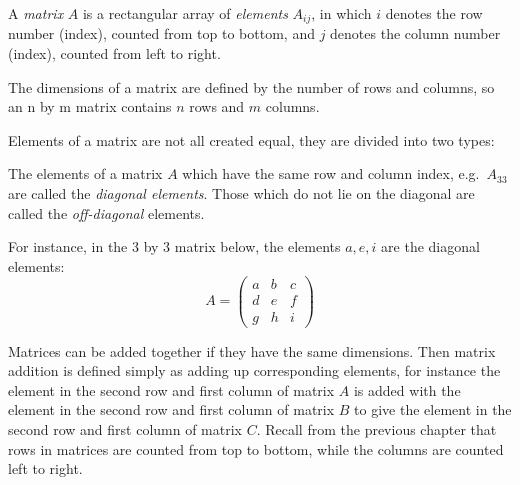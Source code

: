 \documentclass[
  letterpaper,
  DIV=11,
  numbers=noendperiod]{scrreprt}
\begin{document}
\begin{tcolorbox}[enhanced jigsaw, arc=.35mm, colframe=quarto-callout-note-color-frame, left=2mm, opacitybacktitle=0.6, breakable, title=\textcolor{quarto-callout-note-color}{\faInfo}\hspace{0.5em}{Definition}, toprule=.15mm, coltitle=black, bottomtitle=1mm, toptitle=1mm, colback=white, leftrule=.75mm, colbacktitle=quarto-callout-note-color!10!white, titlerule=0mm, opacityback=0, rightrule=.15mm, bottomrule=.15mm]

A \emph{matrix} \(A\) is a rectangular array of \emph{elements}
\(A_{ij}\), in which \(i\) denotes the row number (index), counted from
top to bottom, and \(j\) denotes the column number (index), counted from
left to right.

The dimensions of a matrix are defined by the number of rows and
columns, so an n by m matrix contains \(n\) rows and \(m\) columns.

\end{tcolorbox}

Elements of a matrix are not all created equal, they are divided into
two types:

\begin{tcolorbox}[enhanced jigsaw, arc=.35mm, colframe=quarto-callout-note-color-frame, left=2mm, opacitybacktitle=0.6, breakable, title=\textcolor{quarto-callout-note-color}{\faInfo}\hspace{0.5em}{Definition}, toprule=.15mm, coltitle=black, bottomtitle=1mm, toptitle=1mm, colback=white, leftrule=.75mm, colbacktitle=quarto-callout-note-color!10!white, titlerule=0mm, opacityback=0, rightrule=.15mm, bottomrule=.15mm]

The elements of a matrix \(A\) which have the same row and column index,
e.g.~\(A_{33}\) are called the \emph{diagonal elements}. Those which do
not lie on the diagonal are called the \emph{off-diagonal} elements.

\end{tcolorbox}

For instance, in the 3 by 3 matrix below, the elements \(a, e, i\) are
the diagonal elements: \[
A = \left(\begin{array}{ccc}a & b & c \\d & e & f \\g & h & i\end{array}\right)
\]

Matrices can be added together if they have the same dimensions. Then
matrix addition is defined simply as adding up corresponding elements,
for instance the element in the second row and first column of matrix
\(A\) is added with the element in the second row and first column of
matrix \(B\) to give the element in the second row and first column of
matrix \(C\). Recall from the previous chapter that rows in matrices are
counted from top to bottom, while the columns are counted left to right.
\end{document}
